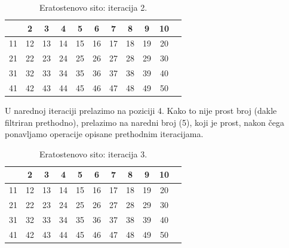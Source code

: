 \begin{table}[H]
	\centering
	\begin{tabular}{|c|c|c|c|c|c|c|c|c|c|c} \hline
	& 2 & 3 & \cellcolor{red!30}  4 & 5 & \cellcolor{red!30} 6 & 7 & \cellcolor{red!30} 8 & \cellcolor{red!70} 9 & \cellcolor{red!30} 10 \\ \hline
	11 &\cellcolor{red!30}  12 & 13 & \cellcolor{red!30} 14 & 15 & \cellcolor{red!30} 16 & 17 & \cellcolor{red!30} \cellcolor{red!30} 18 & 19 & \cellcolor{red!30} \cellcolor{red!30} 20 \\ \hline
	21 & \cellcolor{red!30} 22 & 23 & \cellcolor{red!30} 24 & 25 & \cellcolor{red!30} 26 & \cellcolor{red!70}  27 &\cellcolor{red!30}  28 & 29 & \cellcolor{red!30} \cellcolor{red!30} 30 \\ \hline
	31 & \cellcolor{red!30} 32 & 33 & \cellcolor{red!30} 34 & 35 & \cellcolor{red!30} 36 & 37 & \cellcolor{red!30} 38 & 39 & \cellcolor{red!30} 40 \\ \hline
	41 & \cellcolor{red!30} 42 & 43 & \cellcolor{red!30} 44 & 45 & \cellcolor{red!30} 46 & 47 &\cellcolor{red!30}  48 & 49 &\cellcolor{red!30}  50 \\ \hline     
\end{tabular}
        \caption{Eratostenovo sito: iteracija 2.} \label{eratosten-sieve-it-2}
\end{table}

U narednoj iteraciji prelazimo na poziciji 4. Kako to nije prost broj (dakle filtriran prethodno), prelazimo na naredni broj (5), koji je prost, nakon čega ponavljamo operacije opisane prethodnim iteracijama. 


\begin{table}[H]
	\centering
	\begin{tabular}{|c|c|c|c|c|c|c|c|c|c|c} \hline
		& 2 & 3 & \cellcolor{red!30}  4 & 5 & \cellcolor{red!30} 6 & 7 & \cellcolor{red!30} 8 & \cellcolor{red!70} 9 & \cellcolor{red!30} 10 \\ \hline
		11 &\cellcolor{red!30}  12 & 13 & \cellcolor{red!30} 14 & 15 & \cellcolor{red!30} 16 & 17 & \cellcolor{red!30} \cellcolor{red!30} 18 & 19 & \cellcolor{red!30} \cellcolor{red!30} 20 \\ \hline
		21 & \cellcolor{red!30} 22 & 23 & \cellcolor{red!30} 24 & \cellcolor{red!90} 25 & \cellcolor{red!30} 26 & \cellcolor{red!70}  27 &\cellcolor{red!30}  28 & 29 & \cellcolor{red!30} \cellcolor{red!30} 30 \\ \hline
		31 & \cellcolor{red!30} 32 & 33 & \cellcolor{red!30} 34 & 35 & \cellcolor{red!30} 36 & 37 & \cellcolor{red!30} 38 & 39 & \cellcolor{red!30} 40 \\ \hline
		41 & \cellcolor{red!30} 42 & 43 & \cellcolor{red!30} 44 & 45 & \cellcolor{red!30} 46 & 47 &\cellcolor{red!30}  48 & 49 &\cellcolor{red!30}  50 \\ \hline     
	\end{tabular}
	\caption{Eratostenovo sito: iteracija 3.} \label{eratosten-sieve-it-3}
\end{table}

